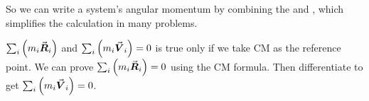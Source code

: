 \documentclass[class=article, crop=false, 12pt]{standalone}
\begin{document}
So we can write a system's angular momentum by combining the  
and ,
which simplifies the calculation in many problems.\\

\begin{notation}[]
    \begin{center}
    \end{center}
    $\sum_i\qty(m_i\va*{R}_i)$ and $\sum_i\qty(m_i\va*{V}_i) = 0 $ is true only if we take CM as the reference point. 
    We can prove $\sum_i\qty(m_i\va*{R}_i) = 0$ using the CM formula.
    Then differentiate to get $\sum_i\qty(m_i\va*{V}_i) = 0$.
\end{notation}
\end{document}

